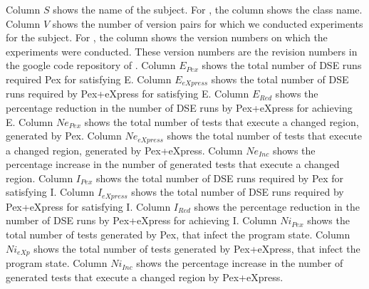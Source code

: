 Column $S$ shows the name of the subject. For , the column shows the class name. Column $V$ shows the number of version pairs for which we conducted experiments for the subject. For , the column shows the version numbers on which the experiments were conducted. These version numbers are the revision numbers in the google code repository of . Column $E_{Pex}$ shows the total number of DSE runs required Pex for satisfying E. Column $E_{eXpress}$ shows the total number of DSE runs required by Pex+eXpress for satisfying E. Column $E_{Red}$ shows the percentage reduction in the number of DSE runs by Pex+eXpress for achieving E. Column $Ne_{Pex}$ shows the total number of tests that execute a changed region, generated by Pex. Column $Ne_{eXpress}$ shows the total number of tests that execute a changed region, generated by Pex+eXpress. Column $Ne_{Inc}$ shows the percentage increase in the number of generated tests that execute a changed region. Column $I_{Pex}$ shows the total number of DSE runs required by Pex for satisfying I. Column $I_{eXpress}$ shows the total number of DSE runs required by Pex+eXpress for satisfying I. Column $I_{Red}$ shows the percentage reduction in the number of DSE runs by Pex+eXpress for achieving I. 
Column $Ni_{Pex}$ shows the total number of tests generated by Pex, that infect the program state. Column $Ni_{eXp}$ shows the total number of tests generated by Pex+eXpress, that infect the program state. Column $Ni_{Inc}$ shows the percentage increase in the number of generated tests that execute a changed region by Pex+eXpress.

